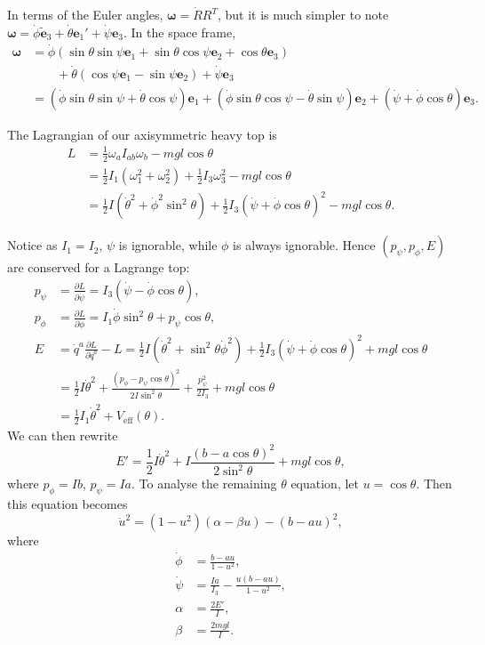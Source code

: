 \documentclass[12pt]{article}
\begin{document}
In terms of the Euler angles, $\bm{\omega} = \dot R R^T$, but it is much simpler to note $\bm{\omega} = \dot \phi \mathbf{\tilde e}_3 + \dot \theta \mathbf{e}_1' + \dot \psi \mathbf{e}_3$. In the space frame,
\begin{align*}
	\bm{\omega} &= \dot \phi(\sin \theta \sin \psi \mathbf{e}_1 + \sin \theta \cos \psi \mathbf{e}_2 + \cos \theta \mathbf{e}_3) \\
		    & \qquad + \dot \theta (\cos \psi \mathbf{e}_1 - \sin \psi \mathbf{e}_2) + \dot \psi \mathbf{e}_3 \\
		    &= (\dot \phi \sin \theta \sin \psi + \dot \theta \cos \psi) \mathbf{e}_1 + (\dot \phi \sin \theta \cos \psi - \dot \theta \sin \psi) \mathbf{e}_2 + (\dot \psi + \dot \phi \cos \theta)\mathbf{e}_3.
\end{align*}

The Lagrangian of our axisymmetric heavy top is
\begin{align*}
	L &= \frac{1}{2} \omega_a I_{ab} \omega_b - mgl \cos \theta \\
	  &= \frac{1}{2} I_1(\omega_1^2 + \omega_2^2) + \frac{1}{2} I_3 \omega_3^2 - mgl \cos \theta \\
	  &= \frac{1}{2} I(\dot \theta^2 + \dot \phi^2 \sin^2 \theta) + \frac{1}{2} I_3 (\dot \psi + \dot \phi \cos \theta)^2 - mgl \cos \theta.
\end{align*}

Notice as $I_1 = I_2$, $\psi$ is ignorable, while $\phi$ is always ignorable. Hence $(p_\psi, p_\phi, E)$ are conserved for a Lagrange top:
\begin{align*}
	p_\psi &= \frac{\partial L}{\partial \dot \psi} = I_3(\dot \psi - \dot \phi \cos \theta), \\
	p_\phi &= \frac{\partial L}{\partial \dot \phi} = I_1 \dot \phi \sin^2\theta + p_\psi \cos \theta, \\
	E &= \dot q^a \frac{\partial L}{\partial \dot q^a} - L = \frac{1}{2} I(\dot \theta^2 + \sin^2 \theta \dot \phi^2) + \frac{1}{2} I_3(\dot \psi + \dot \phi \cos \theta)^2 + mgl \cos \theta \\
	  &= \frac{1}{2} I \dot \theta^2 + \frac{(p_\phi - p_\psi \cos \theta)^2}{2 I \sin^2 \theta} + \frac{p_\psi^2}{2I_3} + mgl \cos \theta \\
	  &= \frac{1}{2}I_1 \dot \theta^2 + V_{\mathrm{eff}}(\theta).
\end{align*}
We can then rewrite
\[
E' = \frac{1}{2} I \dot \theta^2 + I \frac{(b - a \cos \theta)^2}{2 \sin^2 \theta} + mgl \cos \theta,
\]
where $p_\phi = I b$, $p_\psi = Ia$. To analyse the remaining $\theta$ equation, let $u = \cos \theta$. Then this equation becomes
\[
\dot u^2 = (1 - u^2)(\alpha - \beta u) - (b - au)^2,
\]
where
\begin{align*}
	\dot \phi &= \frac{b - au}{1 - u^2}, \\
	\dot \psi &= \frac{I a}{I_3} - \frac{u(b - au)}{1-u^2}, \\
	\alpha &= \frac{2E'}{I},\\
	\beta &= \frac{2mgl}{I}.
\end{align*}
\end{document}
